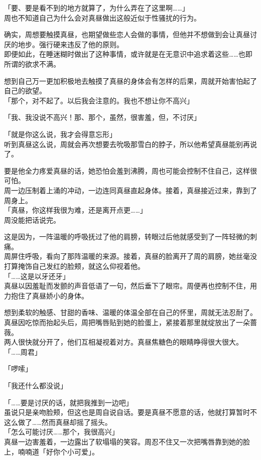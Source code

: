 「要、要是看不到的地方就算了，为什么弄在了这里啊……」\\

周也不知道自己为什么会对真昼做出这般近似于性骚扰的行为。

确实，周想要触摸真昼，也期望做些恋人会做的事情，但他并不想做到会让真昼讨厌的地步。强行硬来违反了他的原则。\\

即便如此，在睡迷糊时做出了这种事情，或许就是在无意识中追求着这些……也即所谓的欲求不满。

想到自己万一更加积极地去触摸了真昼的身体会有怎样的后果，周就开始害怕起了自己的欲望。\\

「那个，对不起了。以后我会注意的。我也不想让你不高兴」

「我、我没说不高兴！那、那个，虽然，很害羞，但，不讨厌」

「就是你这么说，我才会得意忘形」\\

听到真昼这么说，周就会再次想要去吮吸那雪白的脖子，所以他希望真昼能别再说了。

要是他全力疼爱真昼的话，她恐怕会羞到沸腾，周也可能会控制不住自己，这样很可怕。\\

周一边压制着上涌的冲动，一边连同真昼直起身体。接着，真昼接近过来，靠到了周身上。\\

「真昼，你这样我很为难，还是离开点更……」\\

周没能把话说完。

这是因为，一阵温暖的呼吸抚过了他的肩膀，转眼过后他就感受到了一阵轻微的刺痛。\\

周屏住呼吸，看向了那阵温暖的来源。接着，真昼的脸离开了周的肩膀，她丝毫没打算掩饰自己发红的脸颊，就这么仰视着他。\\

「……这是以牙还牙」\\

真昼以因羞耻而发颤的声音低语了一句，然后垂下了眼帘。周便再也控制不住，用力抱住了真昼娇小的身体。

想到柔软的触感、甘甜的香味、温暖的体温全部在自己的怀里，周就无法忍耐了。\\

真昼因吃惊而抬起头后，周把嘴唇贴到她的脸蛋上，紧接着那里就绽放出了一朵蔷薇。\\

两人很快就分开了，他们互相凝视着对方。真昼焦糖色的眼睛睁得很大很大。\\

「……周君」

「啰嗦」

「我还什么都没说」

「……要是讨厌的话，就把我推到一边吧」\\

虽说只是亲吻脸颊，但这也是周自说自话。要是真昼不愿意的话，他就打算暂时不这么做了……然而真昼却摇了摇头。\\

「怎么可能讨厌……那个，我很高兴」\\

真昼一边害羞着，一边露出了软塌塌的笑容。周忍不住又一次把嘴唇靠到她的脸上，喃喃道「好你个小可爱」。
